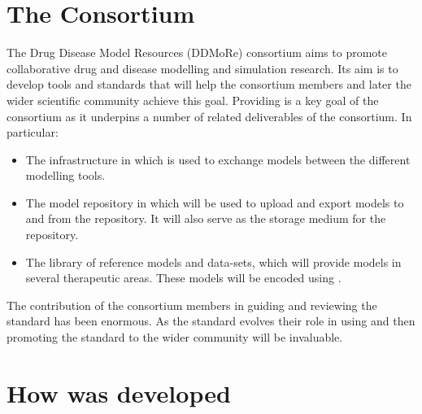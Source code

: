 

\section{The \ddmore Consortium}


The Drug Disease Model Resources (DDMoRe) consortium aims to promote collaborative drug and disease
modelling and simulation research. Its aim is to develop tools and standards that will help the
consortium members and later the wider scientific community achieve this goal. Providing \pharmml
is a key goal of the consortium as it underpins a number of related deliverables of the consortium.
In particular:

\begin{itemize}
\item The \ddmore infrastructure in which \pharmml is used to exchange models between the different modelling tools.
\item The \ddmore model repository in which \pharmml will be used to upload and export models to and from the repository. It will also serve as the storage medium for the repository.
\item The \ddmore library of reference models and data-sets, which will provide models in several therapeutic areas. These models will be encoded using \pharmml.
\end{itemize}

The contribution of the \ddmore consortium members in guiding and reviewing the standard has been enormous.
As the standard evolves their role in using and then promoting the standard to the wider community will be invaluable.

\section{How \pharmml was developed}

